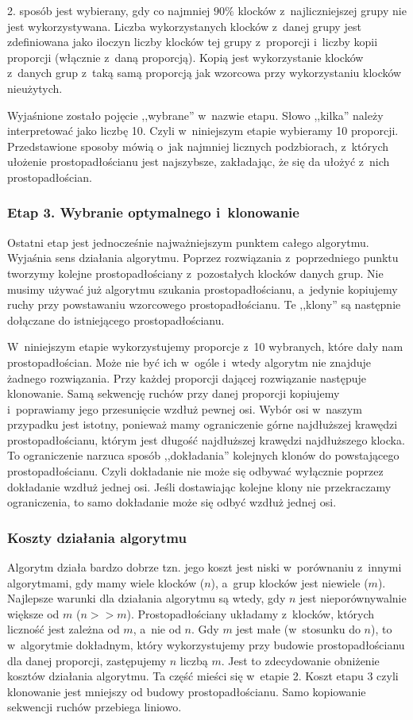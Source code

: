 \documentclass[12pt]{article}
\begin{document}
2. sposób jest wybierany, gdy co najmniej
$90\%$ klocków z~najliczniejszej grupy nie jest wykorzystywana.
Liczba wykorzystanych klocków z~danej grupy jest zdefiniowana jako iloczyn
liczby klocków tej grupy z~proporcji i~liczby kopii proporcji (włącznie
z~daną proporcją). Kopią jest wykorzystanie klocków z~danych grup z~taką
samą proporcją jak wzorcowa przy wykorzystaniu klocków nieużytych. 

Wyjaśnione zostało pojęcie ,,wybrane'' w~nazwie etapu. Słowo ,,kilka''
należy interpretować jako liczbę 10. Czyli w~niniejszym etapie wybieramy
10 proporcji. Przedstawione sposoby mówią o~jak najmniej licznych
podzbiorach, z~których ułożenie prostopadłościanu jest najszybsze,
zakładając, że się da ułożyć z~nich prostopadłościan.

\subsubsection{Etap 3. Wybranie optymalnego i~klonowanie}
Ostatni etap jest jednocześnie najważniejszym punktem całego algorytmu.
Wyjaśnia sens działania algorytmu. Poprzez rozwiązania z~poprzedniego
punktu tworzymy kolejne prostopadłościany z~pozostałych klocków danych
grup. Nie musimy używać już algorytmu szukania prostopadłościanu, a~jedynie
kopiujemy ruchy przy powstawaniu wzorcowego prostopadłościanu. Te ,,klony''
są następnie dołączane do istniejącego prostopadłościanu.

W~niniejszym etapie wykorzystujemy proporcje z~10 wybranych, które dały
nam prostopadłościan. Może nie być ich w~ogóle i~wtedy algorytm nie
znajduje żadnego rozwiązania. Przy każdej proporcji dającej rozwiązanie
następuje klonowanie. Samą sekwencję ruchów przy danej proporcji kopiujemy
i~poprawiamy jego przesunięcie wzdłuż pewnej osi. Wybór osi w~naszym
przypadku jest istotny, ponieważ mamy ograniczenie górne najdłuższej
krawędzi prostopadłościanu, którym jest długość najdłuższej krawędzi
najdłuższego klocka. To ograniczenie narzuca sposób ,,dokładania''
kolejnych klonów do powstającego prostopadłościanu. Czyli dokładanie nie
może się odbywać wyłącznie poprzez dokładanie wzdłuż jednej osi. Jeśli
dostawiając kolejne klony nie przekraczamy ograniczenia, to samo dokładanie
może się odbyć wzdłuż jednej osi.

\subsubsection{Koszty działania algorytmu}
Algorytm działa bardzo dobrze tzn. jego koszt jest niski w~porównaniu
z~innymi algorytmami, gdy mamy wiele klocków ($n$), a~grup klocków
jest niewiele ($m$). Najlepsze warunki dla działania algorytmu są wtedy,
gdy $n$ jest nieporównywalnie większe od $m$ ($n>>m$). Prostopadłościany
układamy z~klocków, których liczność jest zależna od $m$, a~nie od $n$.
Gdy $m$ jest małe (w~stosunku do $n$), to w~algorytmie dokładnym, który
wykorzystujemy przy budowie prostopadłościanu dla danej proporcji,
zastępujemy $n$ liczbą $m$. Jest to zdecydowanie obniżenie kosztów
działania algorytmu. Ta część mieści się w~etapie 2. Koszt etapu 3 czyli
klonowanie jest mniejszy od budowy prostopadłościanu. Samo kopiowanie
sekwencji ruchów przebiega liniowo.
\end{document}
